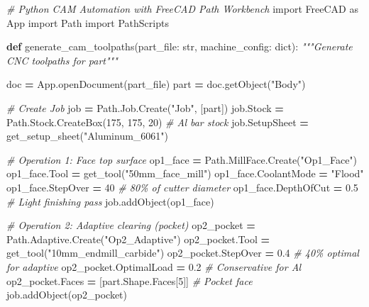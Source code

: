 \documentclass[
]{article}
\newenvironment{Shaded}{\begin{snugshade}}{\end{snugshade}}
\newcommand{\BuiltInTok}[1]{#1}
\newcommand{\CommentTok}[1]{\textcolor[rgb]{0.56,0.35,0.01}{\textit{#1}}}
\newcommand{\DecValTok}[1]{\textcolor[rgb]{0.00,0.00,0.81}{#1}}
\newcommand{\FloatTok}[1]{\textcolor[rgb]{0.00,0.00,0.81}{#1}}
\newcommand{\ImportTok}[1]{#1}
\newcommand{\KeywordTok}[1]{\textcolor[rgb]{0.13,0.29,0.53}{\textbf{#1}}}
\newcommand{\NormalTok}[1]{#1}
\newcommand{\OperatorTok}[1]{\textcolor[rgb]{0.81,0.36,0.00}{\textbf{#1}}}
\newcommand{\StringTok}[1]{\textcolor[rgb]{0.31,0.60,0.02}{#1}}
\begin{document}
\begin{Shaded}
\begin{Highlighting}[]
\CommentTok{\# Python CAM Automation with FreeCAD Path Workbench}
\ImportTok{import}\NormalTok{ FreeCAD }\ImportTok{as}\NormalTok{ App}
\ImportTok{import}\NormalTok{ Path}
\ImportTok{import}\NormalTok{ PathScripts}

\KeywordTok{def}\NormalTok{ generate\_cam\_toolpaths(part\_file: }\BuiltInTok{str}\NormalTok{, machine\_config: }\BuiltInTok{dict}\NormalTok{):}
    \CommentTok{"""Generate CNC toolpaths for part"""}

\NormalTok{    doc }\OperatorTok{=}\NormalTok{ App.openDocument(part\_file)}
\NormalTok{    part }\OperatorTok{=}\NormalTok{ doc.getObject(}\StringTok{"Body"}\NormalTok{)}

    \CommentTok{\# Create Job}
\NormalTok{    job }\OperatorTok{=}\NormalTok{ Path.Job.Create(}\StringTok{"Job"}\NormalTok{, [part])}
\NormalTok{    job.Stock }\OperatorTok{=}\NormalTok{ Path.Stock.CreateBox(}\DecValTok{175}\NormalTok{, }\DecValTok{175}\NormalTok{, }\DecValTok{20}\NormalTok{)  }\CommentTok{\# Al bar stock}
\NormalTok{    job.SetupSheet }\OperatorTok{=}\NormalTok{ get\_setup\_sheet(}\StringTok{"Aluminum\_6061"}\NormalTok{)}

    \CommentTok{\# Operation 1: Face top surface}
\NormalTok{    op1\_face }\OperatorTok{=}\NormalTok{ Path.MillFace.Create(}\StringTok{"Op1\_Face"}\NormalTok{)}
\NormalTok{    op1\_face.Tool }\OperatorTok{=}\NormalTok{ get\_tool(}\StringTok{"50mm\_face\_mill"}\NormalTok{)}
\NormalTok{    op1\_face.CoolantMode }\OperatorTok{=} \StringTok{"Flood"}
\NormalTok{    op1\_face.StepOver }\OperatorTok{=} \DecValTok{40}  \CommentTok{\# 80\% of cutter diameter}
\NormalTok{    op1\_face.DepthOfCut }\OperatorTok{=} \FloatTok{0.5}  \CommentTok{\# Light finishing pass}
\NormalTok{    job.addObject(op1\_face)}

    \CommentTok{\# Operation 2: Adaptive clearing (pocket)}
\NormalTok{    op2\_pocket }\OperatorTok{=}\NormalTok{ Path.Adaptive.Create(}\StringTok{"Op2\_Adaptive"}\NormalTok{)}
\NormalTok{    op2\_pocket.Tool }\OperatorTok{=}\NormalTok{ get\_tool(}\StringTok{"10mm\_endmill\_carbide"}\NormalTok{)}
\NormalTok{    op2\_pocket.StepOver }\OperatorTok{=} \FloatTok{0.4}  \CommentTok{\# 40\% optimal for adaptive}
\NormalTok{    op2\_pocket.OptimalLoad }\OperatorTok{=} \FloatTok{0.2}  \CommentTok{\# Conservative for Al}
\NormalTok{    op2\_pocket.Faces }\OperatorTok{=}\NormalTok{ [part.Shape.Faces[}\DecValTok{5}\NormalTok{]]  }\CommentTok{\# Pocket face}
\NormalTok{    job.addObject(op2\_pocket)}


\end{Highlighting}
\end{Shaded}
\end{document}
